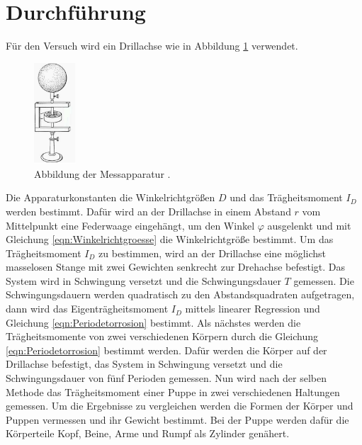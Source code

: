\section{Durchführung}
\label{sec:Durchführung}
Für den Versuch wird ein Drillachse wie in Abbildung \ref{fig:Drillachse} verwendet.
\begin{figure}
  \centering
  \includegraphics[width=0.14\textwidth]{Drillachse.png}
  \caption{Abbildung der Messapparatur \cite{sample}.}
  \label{fig:Drillachse}
\end{figure}
Die Apparaturkonstanten die Winkelrichtgrößen $D$ und das Trägheitsmoment $I_D$
werden bestimmt. Dafür wird an der Drillachse in einem Abstand $r$ vom Mittelpunkt
eine Federwaage eingehängt, um den Winkel $\varphi$ ausgelenkt und mit Gleichung
\eqref{eqn:Winkelrichtgroesse} die Winkelrichtgröße bestimmt.
Um das Trägheitsmoment $I_D$ zu bestimmen, wird an der Drillachse eine möglichst
masselosen Stange mit zwei Gewichten senkrecht zur Drehachse befestigt. Das System
wird in Schwingung versetzt und die Schwingungsdauer $T$ gemessen. Die Schwingungsdauern
werden quadratisch zu den Abstandsquadraten aufgetragen, dann wird das Eigenträgheitsmoment
$I_D$ mittels linearer Regression und Gleichung \eqref{eqn:Periodetorrosion} bestimmt.
Als nächstes werden die Trägheitsmomente von zwei verschiedenen Körpern durch die
Gleichung \eqref{eqn:Periodetorrosion} bestimmt werden. Dafür werden die Körper
auf der Drillachse befestigt, das System in Schwingung versetzt und die Schwingungsdauer
von fünf Perioden gemessen.
Nun wird nach der selben Methode das Trägheitsmoment einer Puppe in zwei verschiedenen
Haltungen gemessen. Um die Ergebnisse zu vergleichen werden die Formen der Körper
und Puppen vermessen und ihr Gewicht bestimmt. Bei der Puppe werden dafür die Körperteile
Kopf, Beine, Arme und Rumpf als Zylinder genähert.
